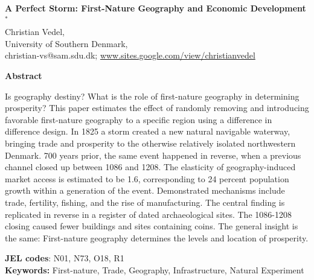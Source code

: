 \documentclass[11pt]{article}
\begin{document}
\begin{titlepage}

    \begin{center}
        \LARGE
        \textbf{A Perfect Storm: First-Nature Geography and Economic Development$^*$} \\
        
        \vspace{0.5cm}
        \large
        Christian Vedel, \\ University of Southern Denmark,\\
        \small
        \vspace{0.25cm}
        christian-vs@sam.sdu.dk; 
        \url{www.sites.google.com/view/christianvedel} 
        
        \vspace{0.75cm}
    
        \large
        \textbf{Abstract} \\     
    \end{center}

   
    \normalsize
    \begin{changemargin}{1cm}{1cm}
    Is geography destiny? What is the role of first-nature geography in determining prosperity? This paper estimates the effect of randomly removing and introducing favorable first-nature geography to a specific region using a difference in difference design. In 1825 a storm created a new natural navigable waterway, bringing trade and prosperity to the otherwise relatively isolated northwestern Denmark. 700 years prior, the same event happened in reverse, when a previous channel closed up between 1086 and 1208. The elasticity of geography-induced market access is estimated to be 1.6, corresponding to 24 percent population growth within a generation of the event. Demonstrated mechanisms include trade, fertility, fishing, and the rise of manufacturing. The central finding is replicated in reverse in a register of dated archaeological sites. The 1086-1208 closing caused fewer buildings and sites containing coins. The general insight is the same: First-nature geography determines the levels and location of prosperity.
    
    \vspace{0.05cm} 
    \textbf{JEL codes}: N01, N73, O18, R1 \\
    \textbf{Keywords:} First-nature, Trade, Geography, Infrastructure, Natural Experiment
    \end{changemargin}

    
    

\end{titlepage}
\end{document}

